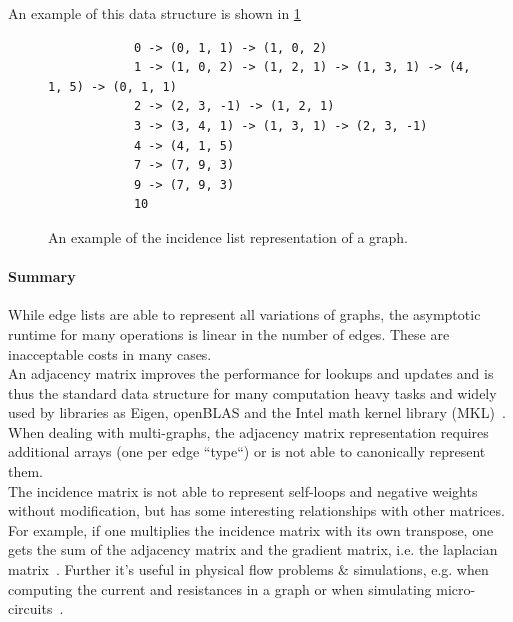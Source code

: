         An example of this data structure is shown in \ref{incidencel}
        
        \begin{figure}[htp]
         \begin{center}
          \begin{verbatim}
            0 -> (0, 1, 1) -> (1, 0, 2)
            1 -> (1, 0, 2) -> (1, 2, 1) -> (1, 3, 1) -> (4, 1, 5) -> (0, 1, 1)
            2 -> (2, 3, -1) -> (1, 2, 1)
            3 -> (3, 4, 1) -> (1, 3, 1) -> (2, 3, -1)
            4 -> (4, 1, 5)
            7 -> (7, 9, 3)
            9 -> (7, 9, 3)
            10
          \end{verbatim}
         \end{center}
         \caption{An example of the incidence list representation of a graph.}
         \label{incidencel}
        \end{figure}
        
        
        
        \paragraph{Summary}
        While edge lists are able to represent all variations of graphs, the asymptotic runtime for many operations is linear in the number of edges. These are inacceptable costs in many cases. \\
        
        An adjacency matrix improves the performance for lookups and updates and is thus the standard data structure for many computation heavy tasks and widely used by libraries as Eigen, openBLAS and the Intel math kernel library (MKL)~\autocite{MatrixStorageSchemes-2021-03-05, EigenTheMatrixclass-2020-12-05, MatrixStorageSchemes-1999-10-01}. When dealing with multi-graphs, the adjacency matrix representation requires additional arrays (one per edge ``type``) or is not able to canonically represent them. \\
        
        The incidence matrix is not able to represent self-loops and negative weights without modification, but has some interesting relationships with other matrices. For example, if one multiplies the incidence matrix with its own transpose, one gets the sum of the adjacency matrix and the gradient matrix, i.e. the laplacian matrix~\autocite{brouwer2011spectra}. Further it's useful in physical flow problems \& simulations, e.g. when computing the current and resistances in a graph or when simulating micro-circuits~\autocite{weinberg1958kirchhoff}. \\
        
